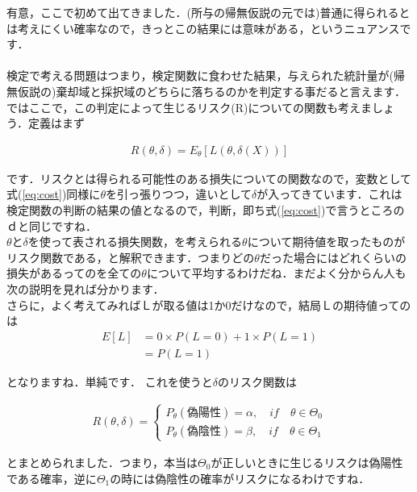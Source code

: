 \documentclass[11pt,a4paper]{ujreport} 	%
\begin{document}
有意，ここで初めて出てきました．(所与の帰無仮説の元では)普通に得られるとは考えにくい確率なので，きっとこの結果には意味がある，というニュアンスです．\\
\\

検定で考える問題はつまり，検定関数に食わせた結果，与えられた統計量が(帰無仮説の)棄却域と採択域のどちらに落ちるのかを判定する事だると言えます．\\

ではここで，この判定によって生じるリスク(R)についての関数も考えましょう．定義はまず

\begin{align}
  R(\theta, \delta) = E_\theta[L(\theta, \delta(X))]
\end{align}

です．リスクとは得られる可能性のある損失についての関数なので，変数として式(\ref{eq:cost})同様に$\theta$を引っ張りつつ，違いとして$\delta$が入ってきています．これは検定関数の判断の結果の値となるので，判断，即ち式(\ref{eq:cost})で言うところのｄと同じですね．\\

$\theta$と$\delta$を使って表される損失関数，を考えられる$\theta$について期待値を取ったものがリスク関数である，と解釈できます．つまりどの$\theta$だった場合にはどれくらいの損失があるってのを全ての$\theta$について平均するわけだね．まだよく分からん人も次の説明を見れば分かります．\\

さらに，よく考えてみればＬが取る値は1か0だけなので，結局Ｌの期待値ってのは
\begin{align}
  E[L] &= 0 \times P(L=0) + 1 \times P(L=1)\\
       &= P(L=1)
\end{align}

となりますね．単純です．
これを使うと$\delta$のリスク関数は

\begin{align}
  R(\theta, \delta) = 
  \left\{
    \begin{array}{l}
    P_\theta(偽陽性)=\alpha, \quad if \quad \theta \in \Theta_0\\
    P_\theta(偽陰性)=\beta, \quad if \quad \theta \in \Theta_1
    \end{array}
  \right.
  \label{eq:risk}
\end{align}

とまとめられました．つまり，本当は$\Theta_0$が正しいときに生じるリスクは偽陽性である確率，逆に$\Theta_1$の時には偽陰性の確率がリスクになるわけですね．\\
\end{document}
